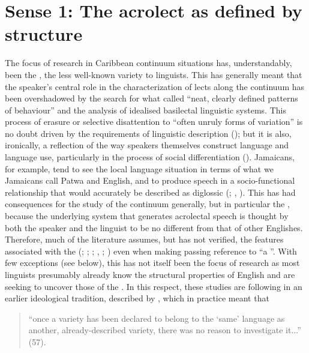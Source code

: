 \section{Sense 1: The acrolect as defined by structure}\label{sec:1.2}
The focus of research in Caribbean continuum situations has, understandably, been the  , the less well-known variety to linguists.  This has generally meant that the speaker’s central role in the characterization of lects along the continuum has been overshadowed by the search for what \citet[341]{Bailey1971} called “neat, clearly defined patterns of behaviour” and the analysis of idealised basilectal linguistic systems.  This process of erasure or selective disattention to “often unruly forms of variation” \citep[23]{Kroskrity2000} is no doubt driven by the requirements of linguistic description (\citealt[33]{Milroy1999}); but it is also, ironically, a reflection of the way speakers themselves construct language and language use, particularly in the process of social differentiation (\citealt[38]{IrvineGal2000}).    Jamaicans, for example, tend to see the local language situation in terms of what we Jamaicans call Patwa and English, and to produce speech in a socio-functional relationship that would accurately be described as diglossic (\citealt[8]{Akers1981}; \citealt{Winford1985}, \citealt[256]{DevonishHarry2004}).  This has had consequences for the study of the continuum generally, but in particular the , because the underlying system that generates acrolectal speech is thought by both the speaker and the linguist to be no different from that of other Englishes.  Therefore, much of the literature assumes, but has not verified, the features associated with the  (\citealt[73]{Akers1981}; \citealt[342]{Bailey1971}; \citealt[209\,n6]{Mufwene2001}; \citealt{Patrick1999}, \citealt[11]{Patrick2000}; \citealt{Winford1991}) even when making passing reference to “a ”.  With few exceptions (see below), this  has not itself been the focus of research as most linguists presumably already know the structural properties of English and are seeking to uncover those of the .  In this respect, these studies are following in an earlier ideological tradition, described by \citet{IrvineGal2000}, which in practice meant that

\begin{quote}
	“once a variety has been declared to belong to the ‘same’ language as another, already-described variety, there was no reason to investigate it...” (57).
\end{quote}

